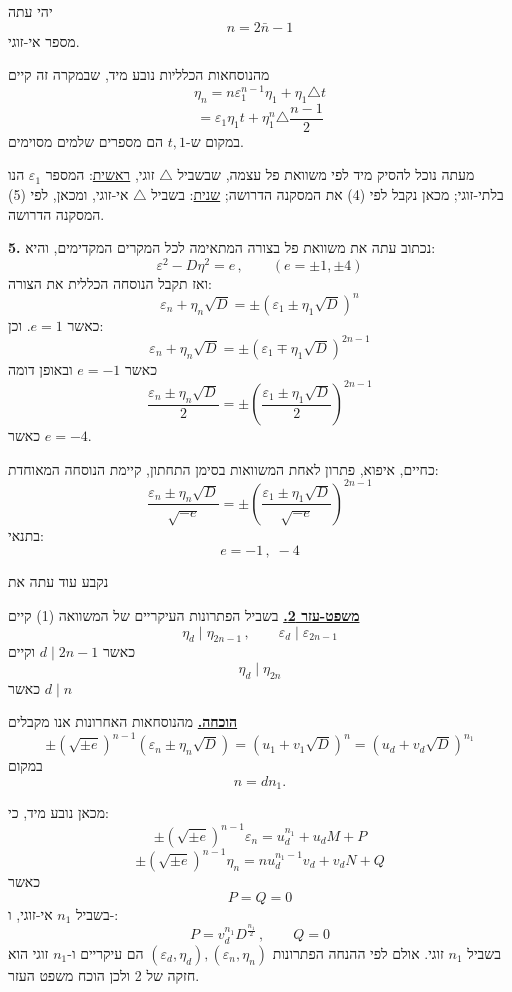 יהי עתה
\[ n = 2\bar{n} - 1 \]
מספר אי-זוגי.

מהנוסחאות הכלליות נובע מיד, שבמקרה זה קיים
\[ \eta_n = n\varepsilon_1^{n-1}\eta_1 + \eta_1 \triangle t \tag{4} \]
\[ = \varepsilon_1 \eta_1 t + \eta_1^n \triangle \frac{n-1}{2} \tag{5} \]
במקום ש-$t, 1$ הם מספרים שלמים מסוימים.

מעתה נוכל להסיק מיד לפי משוואת פל עצמה, שבשביל $\triangle$ זוגי, \underline{ראשית}: המספר $\varepsilon_1$ הנו בלתי-זוגי; מכאן נקבל לפי (4) את המסקנה הדרושה; \underline{שנית}: בשביל $\triangle$ אי-זוגי, ומכאן, לפי (5) המסקנה הדרושה.

\medskip
\noindent\textbf{5.} נכתוב עתה את משוואת פל בצורה המתאימה לכל המקרים המקדימים, והיא:
\[ \varepsilon^2 - D\eta^2 = e \, , \qquad (e = \pm 1, \pm 4) \tag{1} \]
ואז תקבל הנוסחה הכללית את הצורה:
\[ \varepsilon_n + \eta_n\sqrt{D} = \pm(\varepsilon_1 \pm \eta_1\sqrt{D})^n \tag{2} \]
כאשר $e = 1$.
וכן:
\[ \varepsilon_n + \eta_n\sqrt{D} = \pm(\varepsilon_1 \mp \eta_1\sqrt{D})^{2n-1} \tag{3} \]
כאשר $e = -1$
ובאופן דומה
\[ \frac{\varepsilon_n \pm \eta_n\sqrt{D}}{2} = \pm\left(\frac{\varepsilon_1 \pm \eta_1\sqrt{D}}{2}\right)^{2n-1} \tag{4} \]
כאשר $e = -4$.

כחיים, איפוא, פתרון לאחת המשוואות בסימן התחתון, קיימת הנוסחה המאוחדת:
\[ \frac{\varepsilon_n \pm \eta_n\sqrt{D}}{\sqrt{-e}} = \pm\left(\frac{\varepsilon_1 \pm \eta_1\sqrt{D}}{\sqrt{-e}}\right)^{2n-1} \tag{5} \]
בתנאי:
\[ e = -1 \, , \; -4 \]

נקבע עוד עתה את

\bigskip
\noindent\textbf{\underline{משפט-עזר 2.}}
בשביל הפתרונות העיקריים של המשוואה (1) קיים
\[ \eta_d \mid \eta_{2n-1} \, , \qquad \varepsilon_d \mid \varepsilon_{2n-1} \]
כאשר $d \mid 2n-1$
וקיים
\[ \eta_d \mid \eta_{2n} \]
כאשר $d \mid n$

\bigskip
\noindent\textbf{\underline{הוכחה.}}
מהנוסחאות האחרונות אנו מקבלים
\[ \pm(\sqrt{\pm e})^{n-1}(\varepsilon_n \pm \eta_n\sqrt{D}) = (u_1 + v_1\sqrt{D})^n = (u_d + v_d\sqrt{D})^{n_1} \]
במקום
\[ n = dn_1 . \]

מכאן נובע מיד, כי:
\[ \pm(\sqrt{\pm e})^{n-1}\varepsilon_n = u_d^{n_1} + u_dM + P \]
\[ \pm(\sqrt{\pm e})^{n-1}\eta_n = nu_d^{n_1-1}v_d + v_dN + Q \]
כאשר
\[ P = Q = 0 \]
בשביל $n_1$ אי-זוגי, ו-:
\[ P = v_d^{n_1}D^{\frac{n_1}{2}} \, , \qquad Q = 0 \]
בשביל $n_1$ זוגי. אולם לפי ההנחה הפתרונות $(\varepsilon_d, \eta_d), (\varepsilon_n, \eta_n)$ הם עיקריים ו-$n_1$ זוגי הוא חזקה של 2 ולכן הוכח משפט העזר.

